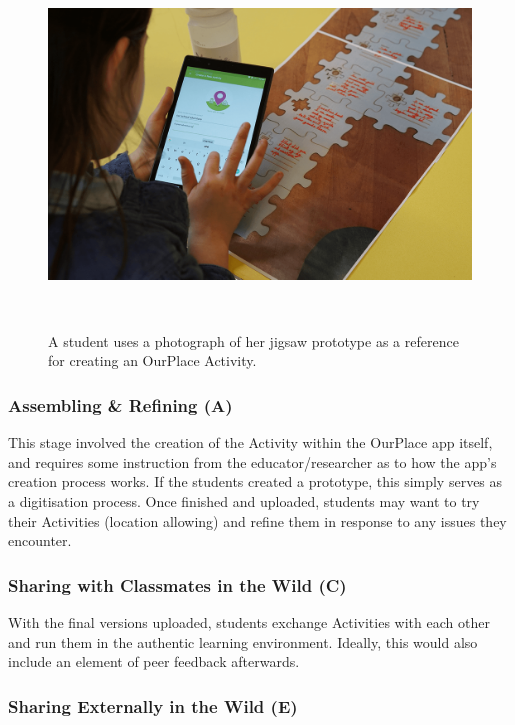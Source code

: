 \documentclass[,hyphens]{sigchi}
\begin{document}
\begin{figure}
\centering
  \includegraphics[width=1\columnwidth]{figures/jigsawToApp}
  \caption{A student uses a photograph of her jigsaw prototype as a reference for creating an OurPlace Activity.}~\label{fig:JigsawToApp}
\end{figure}

\subsubsection{Assembling \& Refining (A)}

This stage involved the creation of the Activity within the OurPlace app itself, and requires some instruction from the educator/researcher as to how the app's creation process works. If the students created a prototype, this simply serves as a digitisation process. Once finished and uploaded, students may want to try their Activities (location allowing) and refine them in response to any issues they encounter.  

\subsubsection{Sharing with Classmates in the Wild (C)}

With the final versions uploaded, students exchange Activities with each other and run them in the authentic learning environment. Ideally, this would also include an element of peer feedback afterwards.

\subsubsection{Sharing Externally in the Wild (E)}
\end{document}
